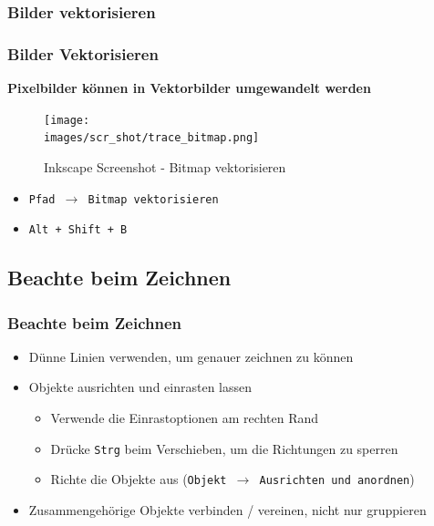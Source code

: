 \documentclass[german]{beamer} %
\newcommand{\images}{vektorzeichnen/}
\begin{document}
\subsubsection{Bilder vektorisieren}
\begin{frame}
	\frametitle{Bilder Vektorisieren}
  	\centering
	\textbf{Pixelbilder können in Vektorbilder umgewandelt werden}
  
	\begin{figure}
  		\centering
    	\texttt{[image: \\images/scr\_shot/trace\_bitmap.png]}
    	\caption{Inkscape Screenshot - Bitmap vektorisieren}
    	\label{fig:inkscape_scr_shot_trace_bitmap}
  	\end{figure}
  	
  	\begin{itemize}
  		\item \texttt{Pfad $\rightarrow$ Bitmap vektorisieren}
  		\item \texttt{Alt + Shift + B}
  	\end{itemize}
  
 \end{frame}


\subsection{Beachte beim Zeichnen}
\begin{frame}
  \frametitle{Beachte beim Zeichnen}
  
  \begin{itemize}
  	\item Dünne Linien verwenden, um genauer zeichnen zu können
  	\item Objekte ausrichten und einrasten lassen
  		\begin{itemize}
  			\item Verwende die Einrastoptionen am rechten Rand
  			\item Drücke \texttt{Strg} beim Verschieben, um die Richtungen zu sperren
  			\item Richte die Objekte aus (\texttt{Objekt $\rightarrow$ Ausrichten und anordnen})
  		\end{itemize}
	\item Zusammengehörige Objekte verbinden / vereinen, nicht nur gruppieren
  \end{itemize} 
  
 \end{frame}
\end{document}
